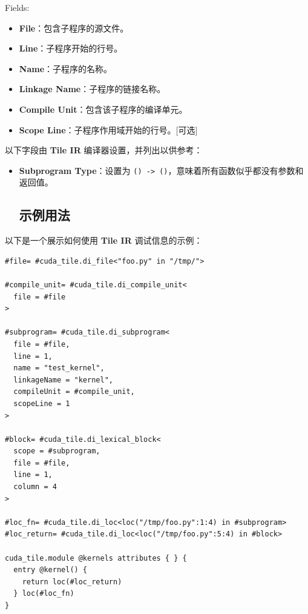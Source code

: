 \documentclass{article}
\begin{document}
Fields:

\begin{itemize}
\item \textbf{File}：包含子程序的源文件。
\item \textbf{Line}：子程序开始的行号。
\item \textbf{Name}：子程序的名称。
\item \textbf{Linkage Name}：子程序的链接名称。
\item \textbf{Compile Unit}：包含该子程序的编译单元。
\item \textbf{Scope Line}：子程序作用域开始的行号。[可选]

\end{itemize}
以下字段由 \textbf{Tile IR} 编译器设置，并列出以供参考：

\begin{itemize}
\item \textbf{Subprogram Type}：设置为 \texttt{() -> ()}，意味着所有函数似乎都没有参数和返回值。


\subsection{示例用法}

\end{itemize}
以下是一个展示如何使用 \textbf{Tile IR} 调试信息的示例：


\begin{lstlisting}
#file= #cuda_tile.di_file<"foo.py" in "/tmp/">

#compile_unit= #cuda_tile.di_compile_unit<
  file = #file
>

#subprogram= #cuda_tile.di_subprogram<
  file = #file,
  line = 1,
  name = "test_kernel",
  linkageName = "kernel",
  compileUnit = #compile_unit,
  scopeLine = 1
>

#block= #cuda_tile.di_lexical_block<
  scope = #subprogram,
  file = #file,
  line = 1,
  column = 4
>

#loc_fn= #cuda_tile.di_loc<loc("/tmp/foo.py":1:4) in #subprogram>
#loc_return= #cuda_tile.di_loc<loc("/tmp/foo.py":5:4) in #block>

cuda_tile.module @kernels attributes { } {
  entry @kernel() {
    return loc(#loc_return)
  } loc(#loc_fn)
}
\end{lstlisting}

\newpage
\end{document}
